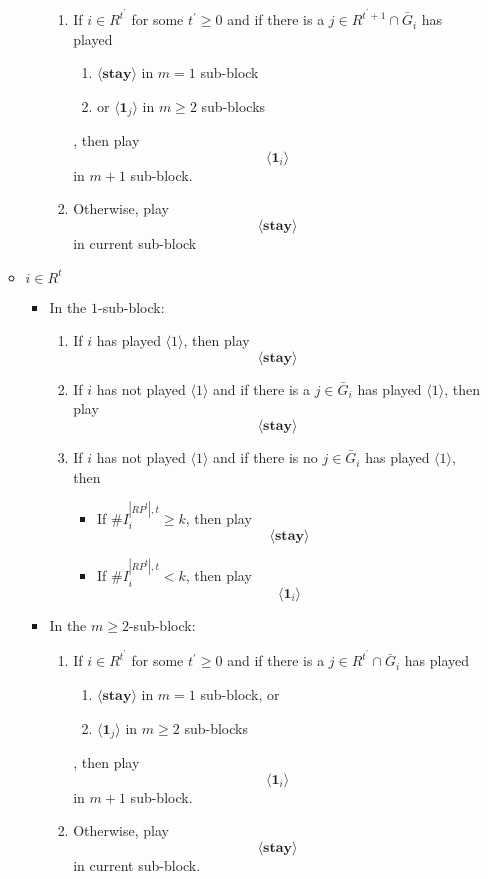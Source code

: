 \documentclass[12pt]{article}
\theoremstyle{remark}
\theoremstyle{remark}
\begin{document}
\begin{itemize}
\begin{itemize}
\begin{itemize}
\begin{enumerate}
\item If $i\in R^{t^{'}}$ for some $t^{'}\geq 0$ and if there is a $j\in R^{t^{'}+1}\cap \bar{G}_i$ has played 
\begin{enumerate}
\item $\langle \textbf{stay} \rangle $ in $m=1$ sub-block
\item or $\langle \mathbf{1}_j \rangle$ in $m\geq 2$ sub-blocks
\end{enumerate}
, then play 
\[\langle \mathbf{1}_i \rangle\] in $m+1$ sub-block.

\item Otherwise, play
\[\langle \textbf{stay} \rangle\] in current sub-block
\end{enumerate}

\end{itemize}

\item $i\in R^t$

\begin{itemize}
\item In the $1$-sub-block:
\begin{enumerate}
\item If $i$ has played $\langle 1 \rangle$, then play
\[\langle \textbf{stay} \rangle \]

\item If $i$ has not played $\langle 1 \rangle$ and if there is a $j\in \bar{G}_i$ has played $\langle 1 \rangle$, then play
\[\langle \textbf{stay} \rangle \]

\item If $i$ has not played $\langle 1 \rangle$ and if there is no $j\in \bar{G}_i$ has played $\langle 1 \rangle$, then
\begin{itemize}
\item If $\# I^{|RP^t|,t}_i\geq k$, then play
\[\langle \textbf{stay} \rangle \]
\item If $\# I^{|RP^t|,t}_i< k$, then play
\[\langle \mathbf{1}_i  \rangle \]
\end{itemize}

\end{enumerate}

\item In the $m\geq 2$-sub-block: 

\begin{enumerate}

\item If $i\in R^{t^{'}}$ for some $t^{'}\geq 0$ and if there is a $j\in R^{t^{'}}\cap \bar{G}_i$ has played 
\begin{enumerate}
\item $\langle \textbf{stay} \rangle$ in $m=1$ sub-block, or
\item $\langle \mathbf{1}_j \rangle$ in $m\geq 2$ sub-blocks
\end{enumerate}
, then play 
\[\langle \mathbf{1}_i \rangle\] in $m+1$ sub-block.
\item Otherwise, play
\[\langle \textbf{stay} \rangle\] in current sub-block.
\end{enumerate}


\end{itemize}
\end{itemize}
\end{itemize}
\end{document}
